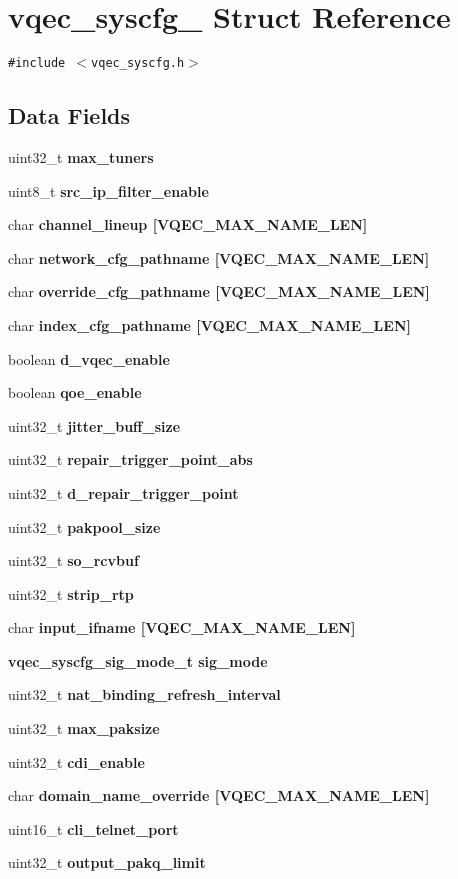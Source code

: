 \section{vqec\_\-syscfg\_\- Struct Reference}
\label{structvqec__syscfg__}
{\tt \#include $<$vqec\_\-syscfg.h$>$}

\subsection*{Data Fields}
\begin{CompactItemize}
\item 
uint32\_\-t \bf{max\_\-tuners}
\item 
uint8\_\-t \bf{src\_\-ip\_\-filter\_\-enable}
\item 
char \bf{channel\_\-lineup} [VQEC\_\-MAX\_\-NAME\_\-LEN]
\item 
char \bf{network\_\-cfg\_\-pathname} [VQEC\_\-MAX\_\-NAME\_\-LEN]
\item 
char \bf{override\_\-cfg\_\-pathname} [VQEC\_\-MAX\_\-NAME\_\-LEN]
\item 
char \bf{index\_\-cfg\_\-pathname} [VQEC\_\-MAX\_\-NAME\_\-LEN]
\item 
boolean \bf{d\_\-vqec\_\-enable}
\item 
boolean \bf{qoe\_\-enable}
\item 
uint32\_\-t \bf{jitter\_\-buff\_\-size}
\item 
uint32\_\-t \bf{repair\_\-trigger\_\-point\_\-abs}
\item 
uint32\_\-t \bf{d\_\-repair\_\-trigger\_\-point}
\item 
uint32\_\-t \bf{pakpool\_\-size}
\item 
uint32\_\-t \bf{so\_\-rcvbuf}
\item 
uint32\_\-t \bf{strip\_\-rtp}
\item 
char \bf{input\_\-ifname} [VQEC\_\-MAX\_\-NAME\_\-LEN]
\item 
\bf{vqec\_\-syscfg\_\-sig\_\-mode\_\-t} \bf{sig\_\-mode}
\item 
uint32\_\-t \bf{nat\_\-binding\_\-refresh\_\-interval}
\item 
uint32\_\-t \bf{max\_\-paksize}
\item 
uint32\_\-t \bf{cdi\_\-enable}
\item 
char \bf{domain\_\-name\_\-override} [VQEC\_\-MAX\_\-NAME\_\-LEN]
\item 
uint16\_\-t \bf{cli\_\-telnet\_\-port}
\item 
uint32\_\-t \bf{output\_\-pakq\_\-limit}

\end{CompactItemize}
